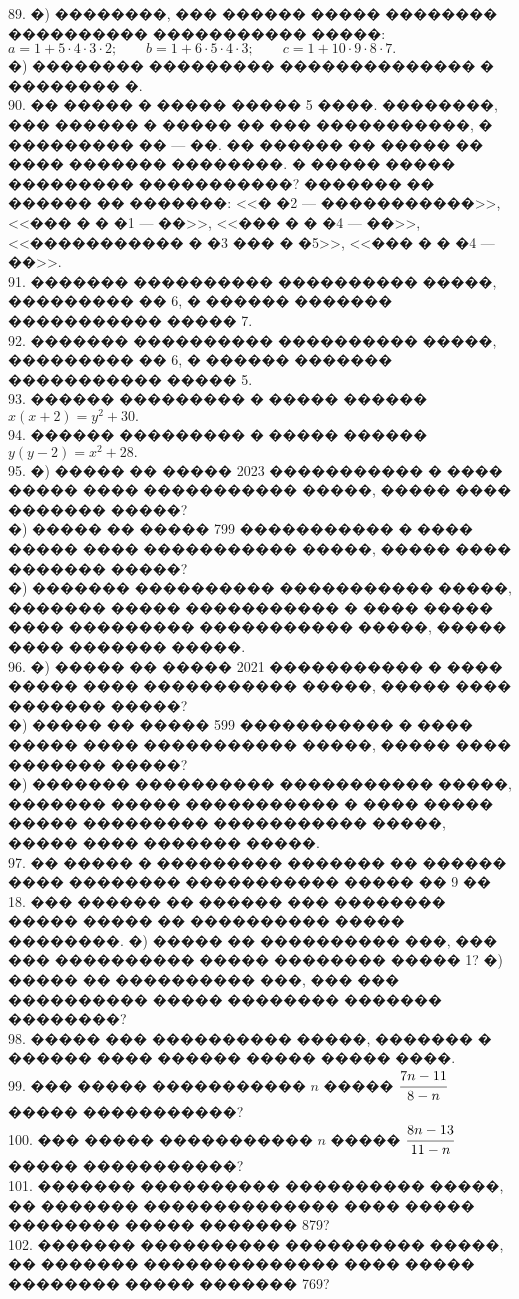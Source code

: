 \documentclass[12pt]{article}
\begin{document}
89. �) ��������, ��� ������ ����� �������� ���������� ����������� �����:\\
$a=1+5\cdot4\cdot3\cdot2;\qquad b=1+6\cdot5\cdot4\cdot3;\qquad c=1+10\cdot9\cdot8\cdot7.$\\
�) �������� ��������� �������������� � �������� �.\\
90. �� ����� � ����� ����� 5 ����. ��������, ��� ������ � ����� �� ��� �����������, � ��������� �� --- ��. �� ������ �� ����� �� ���� ������� ��������. � ����� ����� ��������� �����������? ������� �� ������ �� �������: <<� �2 --- �����������>>, <<��� � � �1 --- ��>>, <<��� � � �4 --- ��>>, <<����������� � �3 ��� � �5>>,
<<��� � � �4 --- ��>>.\\
91. ������� ���������� ���������� �����, ��������� �� 6, � ������ ������� ����������� ����� 7.\\
92. ������� ���������� ���������� �����, ��������� �� 6, � ������ ������� ����������� ����� 5.\\
93. ������ ��������� � ����� ������ $x(x+2)=y^2+30.$\\
94. ������ ��������� � ����� ������ $y(y-2)=x^2+28.$\\
95. �) ����� �� ����� 2023 ����������� � ���� ����� ���� ����������� �����, ����� ���� ������� �����?\\
�) ����� �� ����� 799 ����������� � ���� ����� ���� ����������� �����, ����� ���� ������� �����?\\
�) ������� ���������� ����������� �����, ������� ����� ����������� � ���� ����� ���� ��������� ����������� �����, ����� ���� ������� �����.\\
96. �) ����� �� ����� 2021 ����������� � ���� ����� ���� ����������� �����, ����� ���� ������� �����?\\
�) ����� �� ����� 599 ����������� � ���� ����� ���� ����������� �����, ����� ���� ������� �����?\\
�) ������� ���������� ����������� �����, ������� ����� ����������� � ���� ����� ����� ��������� ����������� �����, ����� ���� ������� �����.\\
97. �� ����� � ��������� ������� �� ������ ���� �������� ����������� ����� �� 9 �� 18. ��� ������ �� ������ ��� �������� ����� ����� �� ���������� ����� ��������. �) ����� �� ���������� ���, ��� ��� ���������� ����� �������� ����� 1? �) ����� �� ���������� ���, ��� ��� ���������� ����� �������� ������� ��������?\\
98. ����� ��� ���������� �����, ������� � ������ ���� ������ ����� ����� ����.\\
99. ��� ����� ����������� $n$ ����� $\cfrac{7n-11}{8-n}$ ����� �����������?\\
100. ��� ����� ����������� $n$ ����� $\cfrac{8n-13}{11-n}$ ����� �����������?\\
101. ������� ���������� ���������� �����, �� ������� �������������� ���� ����� �������� ����� ������� 879?\\
102. ������� ���������� ���������� �����, �� ������� �������������� ���� ����� �������� ����� ������� 769?
\newpage
\end{document}
